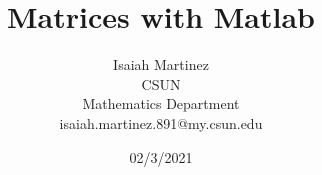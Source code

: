 \documentclass[a4paper,10pt]{article}
\begin{document}
%
   \title{Matrices with Matlab}

   \author{Isaiah Martinez \\ CSUN \\ Mathematics Department \\ isaiah.martinez.891@my.csun.edu}
          
   \date{02/3/2021}

   \maketitle
   
   \tableofcontents
 
  \newpage


  

  \newpage

  
\end{document}
